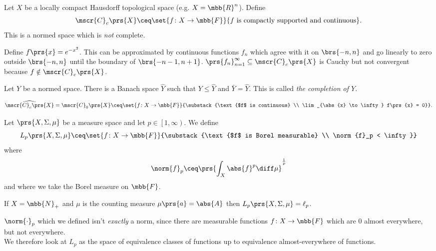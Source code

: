 \documentclass[10pt, twoside]{book}
\begin{document}
\begin{example}
Let $X$ be a locally compact Hausdorff topological space (e.g. $X = \mbb{R}^n$).
Define
\[\mscr{C}_c\prs{X} \ceq \set{f \colon X \to \mbb{F}}{f \text{ is compactly supported and continuous}} \text{.}\]
This is a normed space which is \emph{not} complete.

Define $f\prs{x} = e^{-x^2}$. This can be approximated by continuous functions $f_n$ which agree with it on $\brs{-n,n}$ and go linearly to zero outside $\brs{-n,n}$ until the boundary of $\brs{-n-1, n+1}$. $\prs{f_n}_{n = 1}^{\infty} \subseteq \mscr{C}_c\prs{X}$ is Cauchy but not convergent because $f \notin \mscr{C}_c\prs{X}$.
\end{example}

\begin{definition}
Let $Y$ be a normed space. There is a Banach space $\hat{Y}$ such that $Y \leq \hat{Y}$ and $\bar{Y} = \hat{Y}$. This is called \emph{the completion of $Y$}.
\end{definition}

\begin{example}
\[\widehat{\mscr{C}_c\prs{X}} = \mscr{C}_0\prs{X} \ceq \set{f \colon X \to \mbb{F}}{\substack{\text{$f$ is continuous} \\ \lim_{\abs{x} \to \infty} f\prs{x} = 0}} \text{.}\]
\end{example}

\begin{example}
Let $\prs{X, \Sigma, \mu}$ be a measure space and let $p \in \left[1, \infty \right)$.
We define
\[L_p\prs{X, \Sigma, \mu} \ceq \set{f \colon X \to \mbb{F}}{\substack{\text{$f$ is Borel measurable} \\ \norm{f}_p < \infty}}\]
where
\[\norm{f}_p \ceq \prs{\int_X \abs{f}^p \diff \mu}^{\frac{1}{p}}\]
and where we take the Borel measure on $\mbb{F}$.
\end{example}

\begin{remark}
If $X = \mbb{N}_+$ and $\mu$ is the counting measure $\mu\prs{a} = \abs{A}$ then $L_p\prs{X, \Sigma, \mu} = \ell_p$.
\end{remark}

\begin{remark}
$\norm{\cdot}_p$ which we defined isn't \emph{exactly} a norm, since there are measurable functions $f \colon X \to \mbb{F}$ which are $0$ almost everywhere, but not everywhere.
\\
We therefore look at $L_p$ as the space of equivalence classes of functions up to equivalence almost-everywhere of functions.
\end{remark}
\end{document}
